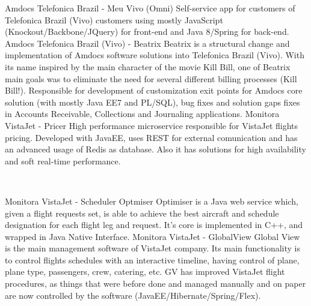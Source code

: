 \documentclass[]{friggeri-cv}
\begin{document}
\begin{entrylist}
 \entry
    {Amdocs}
    {Telefonica Brazil - Meu Vivo (Omni)}
    {\href{}{}}
    {Self-service app for customers of Telefonica Brazil (Vivo) customers using mostly JavaScript (Knockout/Backbone/JQuery) for front-end and Java 8/Spring for back-end.} 
 \entry
    {Amdocs}
    {Telefonica Brazil (Vivo) - Beatrix}
    {\href{}{}}
    {Beatrix is a structural change and implementation of Amdocs software solutions into Telefonica Brazil (Vivo). With its name inspired by the main character of the movie Kill Bill, one of Beatrix main goals was to eliminate the need for several different billing processes (Kill Bill!). Responsible for development of customization exit points for Amdocs core solution (with mostly Java EE7 and PL/SQL), bug fixes and solution gaps fixes in Accounts Receivable, Collections and Journaling applications.}
 \entry
    {Monitora}
    {VistaJet - Pricer }
    {\href{}{}}
    {High performance microservice responsible for VistaJet flights pricing. Developed with JavaEE, uses REST for external comunication and has an advanced usage of Redis as database. Also it has solutions for high availability and soft real-time performance.}

\end{entrylist}
\\
\begin{entrylist}
 \entry
    {Monitora}
    {VistaJet - Scheduler Optmiser }
    {\href{}{}}
    {Optimiser is a Java web service which, given a flight requests set, is able to achieve the best aircraft and schedule designation for each flight leg and request. It's core is implemented in C++, and wrapped in Java Native Interface.}
  \entry
    {Monitora}
    {VistaJet - GlobalView }
    {\href{}{}}
    {Global View is the main management software of VistaJet company. Its main functionality is to control flights schedules with an interactive timeline, having control of plane, plane type, passengers, crew, catering, etc. GV has improved VistaJet flight procedures, as things that were before done and managed manually and on paper are now controlled by the software (JavaEE/Hibernate/Spring/Flex).}   

\begin{comment}
  \entry
    {Simples}
    {Let's - Vistoria }
    {\href{}{}}
    {Android app for car survey with a web module for overall management of performed (and to perform) inspections. (Native Android)}
    
  \entry
    {Cast IT}
    {SEFIN - Declaração Eletrônica de Serviços de Instituições Financeiras (DESIF) }
    {\href{}{https://desif.prefeitura.sp.gov.br/}}
    {Developed to SEFIN (Finance Department of São Paulo), DESIF's main goal is to validate statements of statewide financial institutions, performing in a few minutes documents validations that used to take weeks when done by human hands. (Java EE7) }
\end{comment}

\end{entrylist}
\end{document}
